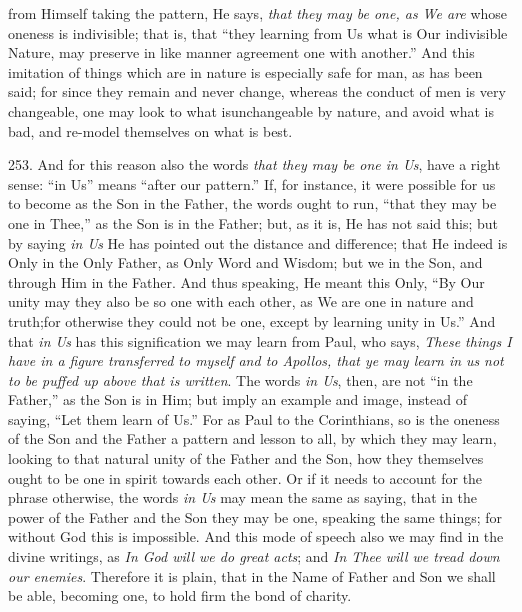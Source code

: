 from Himself taking the pattern, He says, \emph{that they may be one, as
We are} whose oneness is indivisible; that is, that ``they learning
from Us what is Our indivisible Nature, may preserve in like manner
agreement one with another.'' And this imitation of things which are in
nature is especially safe for man, as has been said; for since they
remain and never change, whereas the conduct of men is very
changeable, one may look to what is\emph{}unchangeable by nature, and
avoid what is bad, and re-model themselves on what is best.

253. And for this reason also the
words \emph{that they may be one in Us}, have a right sense: ``in Us''
means ``after our pattern.'' If, for instance, it were possible for us
to become as the Son in the Father, the words ought to run, ``that they
may be one in Thee,'' as the Son is in the Father; but, as it is, He
has not said this; but by saying \emph{in Us} He has pointed out the
distance and difference; that He indeed is Only in the Only Father, as
Only Word and Wisdom; but we in the Son, and through Him in the
Father. And thus speaking, He meant this Only, ``By Our unity may they
also be so one with each other, as We are one in nature and
truth;\emph{}for otherwise they could not be one, except by learning
unity in Us.'' And that \emph{in Us} has this signification we may
learn from Paul, who says, \emph{These things I have in a figure
transferred to myself and to Apollos, that ye may learn in us} \emph{not
to be puffed up above that is written}. The words \emph{in Us},
then, are not ``in the Father,'' as the Son is in Him; but imply an
example and image, instead of saying, ``Let them learn of Us.'' For as
Paul to the Corinthians, so is the oneness of the Son and the Father a
pattern and lesson to all, by which they may learn, looking to that
natural unity of the Father and the Son, how they themselves ought to
be one in spirit towards each other. Or if it needs to account for the
phrase otherwise, the words \emph{in Us} may mean the same as saying,
that in the power of the Father and the Son they may be one, speaking
the same things; for without God this is impossible. And this mode of
speech also we may find in the divine writings, as \emph{In God will we
do great acts}; and \emph{In Thee will we tread down our enemies}.
Therefore it is plain, that in the Name of Father and Son we shall be
able, becoming one, to hold firm the bond of charity.

